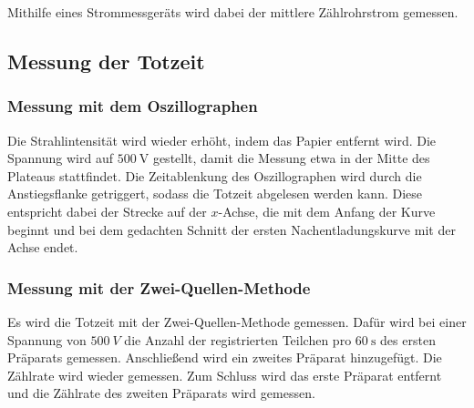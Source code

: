 \noindent Mithilfe eines Strommessgeräts wird dabei der mittlere Zählrohrstrom gemessen.


\subsection{Messung der Totzeit}
\subsubsection{Messung mit dem Oszillographen}
Die Strahlintensität wird wieder erhöht, indem das Papier entfernt wird.
Die Spannung wird auf $\SI{500}{\volt}$ gestellt, damit die Messung etwa in der Mitte des Plateaus stattfindet.
Die Zeitablenkung des Oszillographen wird durch die Anstiegsflanke getriggert, sodass die Totzeit abgelesen werden kann. Diese entspricht dabei der Strecke auf der $x$-Achse, die mit dem Anfang der Kurve beginnt und bei dem gedachten Schnitt der ersten Nachentladungskurve mit der Achse endet.

\subsubsection{Messung mit der Zwei-Quellen-Methode}
Es wird die Totzeit mit der Zwei-Quellen-Methode gemessen. Dafür wird bei einer Spannung von $\SI{500}{V}$ die Anzahl der registrierten Teilchen pro $\SI{60}{\second}$ des ersten Präparats gemessen. Anschließend wird ein zweites Präparat hinzugefügt. Die Zählrate wird wieder gemessen. Zum Schluss wird das erste Präparat entfernt und die Zählrate des zweiten Präparats wird gemessen.